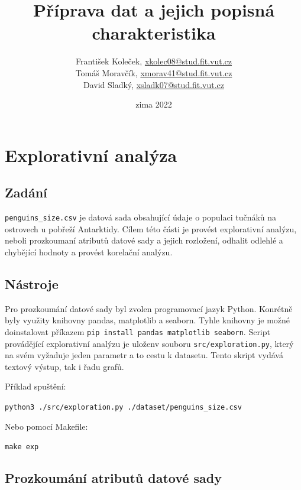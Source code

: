 \documentclass[10pt,xcolor=pdflatex,dvipsnames,table,oneside]{book}
\author{
    František Koleček, \href{mailto:xkolec08@stud.fit.vut.cz}{xkolec08@stud.fit.vut.cz} \\
    Tomáš Moravčík, \href{mailto:xmorav41@stud.fit.vut.cz}{xmorav41@stud.fit.vut.cz} \\
    David Sladký, \href{mailto:xsladk07@stud.fit.vut.cz}{xsladk07@stud.fit.vut.cz}
    }
\title{Příprava dat a jejich popisná charakteristika}
\date{zima 2022}
\begin{document}

\hypersetup{pageanchor=false}%
\maketitle
\hypersetup{pageanchor=true}

\tableofcontents

\newpage%

\chapter{Explorativní analýza}

\section{Zadání}

\verb|penguins_size.csv| je datová sada obsahující údaje o populaci tučnáků na ostrovech u pobřeží Antarktidy. Cílem
této části je provést explorativní analýzu, neboli prozkoumaní atributů datové sady a jejich rozložení, odhalit odlehlé a chybějící
hodnoty a provést korelační analýzu.

\section{Nástroje}
Pro prozkoumání datové sady byl zvolen programovací jazyk Python. Konrétně byly využity knihovny pandas, matplotlib a seaborn.
Tyhle knihovny je možné doinstalovat příkazem \verb|pip install pandas matplotlib seaborn|. Script provádějící explorativní
analýzu je uloženv souboru \verb|src/exploration.py|, který na svém vyžaduje jeden parametr a to cestu k datasetu. Tento
skript vydává textový výstup, tak i řadu grafů. \

Příklad spuštění: \

\verb|python3 ./src/exploration.py ./dataset/penguins_size.csv|\

Nebo pomocí Makefile: \

\verb|make exp|\

\section{Prozkoumání atributů datové sady}
\end{document}
